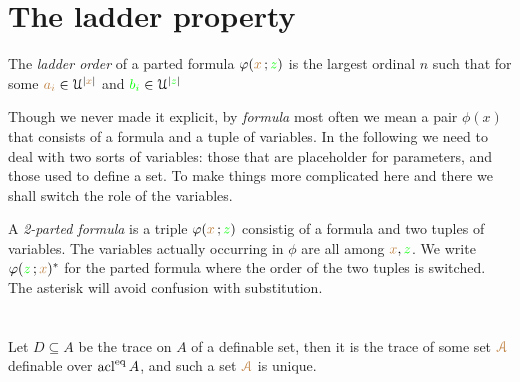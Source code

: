 \documentclass[creche.tex]{subfiles}
\begin{document}
\section{The ladder property}

The \emph{ladder order\/} of a parted formula $\varphi({\color{brown} x}\,;{\color{green} z})$ is the largest ordinal $n$ such that for some ${\color{brown} a_i}\in\EuScript U^{|{\color{brown} x}|}$ and ${\color{green} b_i}\in\EuScript U^{|{\color{green} z}|}$ 

Though we never made it explicit, by \textit{formula\/} most often we mean a pair $\phi(x)$ that consists of a formula and a tuple of variables. In the following we need to deal with two sorts of variables: those that are placeholder for parameters, and those used to define a set. To make things more complicated here and there we shall switch the role of the variables.

\begin{definition}\label{def_parted-fla}
A \emph{2-parted formula\/} is a triple $\varphi({\color{brown} x}\,;{\color{green} z})$ consistig of a formula and two tuples of variables. The variables actually occurring in $\phi$ are all among ${\color{brown} x},{\color{green} z}$. We write $\varphi({\color{green} z}\,;{\color{brown} x})^*$ for the parted formula where the order of the two tuples is switched. The asterisk will avoid confusion with substitution.
\end{definition}

\section{}


Let $D\subseteq A$ be the trace on $A$ of a definable set, then it is the trace of some set ${\color{brown}{\EuScript A}}$ definable over $\mathop{\rm acl}^{{\rm eq}} A$, and such a set ${\color{brown}{\EuScript A}}$ is unique.
\end{document}
